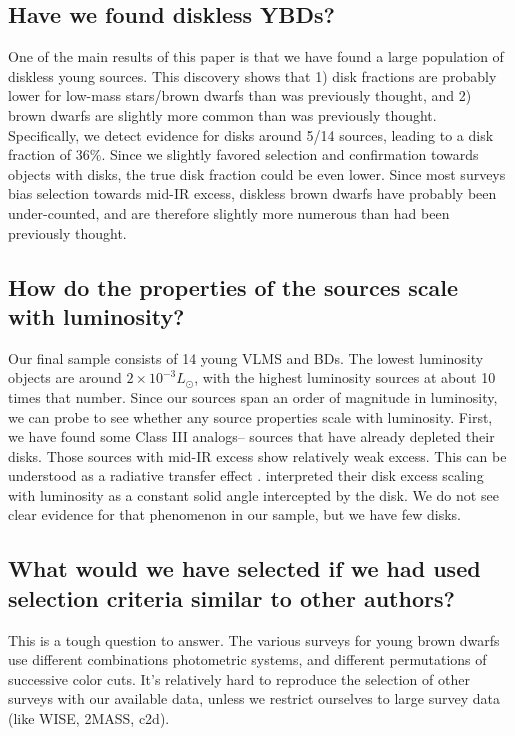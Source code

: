 \documentclass[12pt,preprint]{aastex}
\begin{document}
\subsection{Have we found diskless YBDs?}
One of the main results of this paper is that we have found a large population of diskless young sources.  This discovery shows that 1) disk fractions are probably lower for low-mass stars/brown dwarfs than was previously thought, and 2) brown dwarfs are slightly more common than was previously thought.  Specifically, we detect evidence for disks around 5/14 sources, leading to a disk fraction of 36\%.  Since we slightly favored selection and confirmation towards objects with disks, the true disk fraction could be even lower.  Since most surveys bias selection towards mid-IR excess, diskless brown dwarfs have probably been under-counted, and are therefore slightly more numerous than had been previously thought.


\subsection{How do the properties of the sources scale with luminosity?}
Our final sample consists of 14 young VLMS and BDs.  The lowest luminosity objects are around $2 \times 10^{-3} L_{\odot}$, with the highest luminosity sources at about 10 times that number.  Since our sources span an order of magnitude in luminosity, we can probe to see whether any source properties scale with luminosity.  First, we have found some Class III analogs-- sources that have already depleted their disks.  Those sources with mid-IR excess show relatively weak excess.  This can be understood as a radiative transfer effect \citep{2012A&A...539A...9M,2009MNRAS.394L.141E}.  \cite{allers06} interpreted their disk excess scaling with luminosity as a constant solid angle intercepted by the disk.  We do not see clear evidence for that phenomenon in our sample, but we have few disks.  

\subsection{What would we have selected if we had used selection criteria similar to other authors?}
This is a tough question to answer.  The various surveys for young brown dwarfs use different combinations photometric systems, and different permutations of successive color cuts.  It's relatively hard to reproduce the selection of other surveys with our available data, unless we restrict ourselves to large survey data (like WISE, 2MASS, c2d).  
\end{document}
